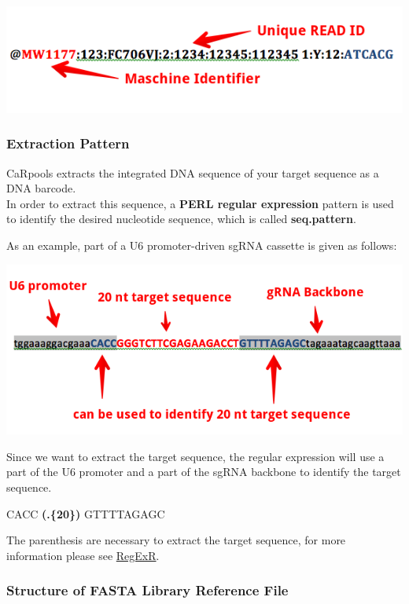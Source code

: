 \documentclass[]{article}
\begin{document}
\includegraphics{./pictures/fastq-format-example.png}

\subsubsection{Extraction Pattern}\label{extraction-pattern}

CaRpools extracts the integrated DNA sequence of your target sequence as
a DNA barcode.\\
In order to extract this sequence, a \textbf{PERL regular expression}
pattern is used to identify the desired nucleotide sequence, which is
called \textbf{seq.pattern}.

As an example, part of a U6 promoter-driven sgRNA cassette is given as
follows:

\includegraphics{./pictures/extraction.png}

Since we want to extract the target sequence, the regular expression
will use a part of the U6 promoter and a part of the sgRNA backbone to
identify the target sequence.

CACC \textbf{(.\{20\})} GTTTTAGAGC

The parenthesis are necessary to extract the target sequence, for more
information please see \href{http://www.regexr.com/}{RegExR}.

\subsubsection{Structure of FASTA Library Reference
File}\label{structure-of-fasta-library-reference-file}
\end{document}
